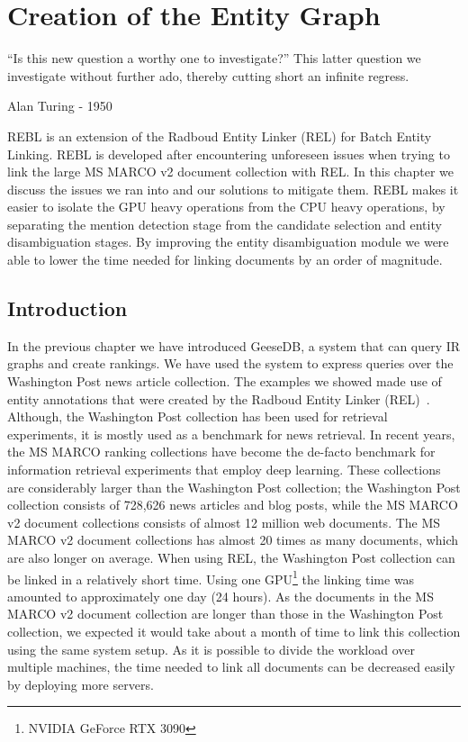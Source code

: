 \chapter{Creation of the Entity Graph}
\label{a-graph-of-entities}

\epigraph{``Is this new question a worthy one to investigate?'' This latter question we investigate without further ado, thereby cutting short an infinite regress.}{Alan Turing - 1950}


\begin{Abstract}
	\begin{changemargin}{1cm}{1cm}
		REBL is an extension of the Radboud Entity Linker (REL) for Batch Entity Linking. 
		REBL is developed after encountering unforeseen issues when trying to link the large MS MARCO v2 document collection with REL. In this chapter we discuss the issues we ran into and our solutions to mitigate them. REBL makes it easier to isolate the GPU heavy operations from the CPU heavy operations, by separating the mention detection stage from the candidate selection and entity disambiguation stages. By improving the entity disambiguation module we were able to lower the time needed for linking documents by an order of magnitude.
	\end{changemargin}
\end{Abstract}

\section{Introduction}
In the previous chapter we have introduced GeeseDB, a system that can query IR graphs and create rankings. We have used the system to express queries over the Washington Post news article collection. The examples we showed made use of entity annotations that were created by the Radboud Entity Linker (REL)~\citep{rel}.
Although, the Washington Post collection has been used for retrieval experiments, it is mostly used as a benchmark for news retrieval. 
In recent years, the MS MARCO ranking collections have become the de-facto benchmark for information retrieval experiments that employ deep learning. These collections are considerably larger than the Washington Post collection; the Washington Post collection consists of 728,626 news articles and blog posts, while the MS MARCO v2 document collections consists of almost 12 million web documents. The MS MARCO v2 document collections has almost 20 times as many documents, which are also longer on average.
When using REL, the Washington Post collection can be linked in a relatively short time. Using one GPU\footnote{NVIDIA GeForce RTX 3090} the linking time was amounted to approximately one day (24 hours). As the documents in the MS MARCO v2 document collection are longer than those in the Washington Post collection, we expected it would take about a month of time to link this collection using the same system setup. As it is possible to divide the workload over multiple machines, the time needed to link all documents can be decreased easily by deploying more servers. 

